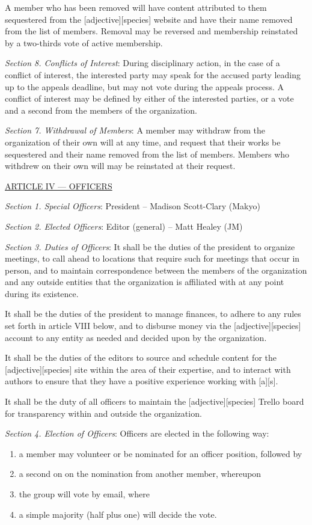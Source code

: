 \documentclass{article}
\begin{document}
A member who has been removed will have content attributed to them sequestered from the [adjective][species] website and have their name removed from the list of members.  Removal may be reversed and membership reinstated by a two-thirds vote of active membership.

\emph{Section 8. Conflicts of Interest}: During disciplinary action, in the case of a conflict of interest, the interested party may speak for the accused party leading up to the appeals deadline, but may not vote during the appeals process.  A conflict of interest may be defined by either of the interested parties, or a vote and a second from the members of the organization.

\emph{Section 7. Withdrawal of Members}: A member may withdraw from the organization of their own will at any time, and request that their works be sequestered and their name removed from the list of members.  Members who withdrew on their own will may be reinstated at their request.

\bigskip

\large{\underline{ARTICLE IV --- OFFICERS}}

\emph{Section 1. Special Officers}: President -- Madison Scott-Clary (Makyo)

\emph{Section 2. Elected Officers}: Editor (general) -- Matt Healey (JM)

\emph{Section 3. Duties of Officers}: It shall be the duties of the president to organize meetings, to call ahead to locations that require such for meetings that occur in person, and to maintain correspondence between the members of the organization and any outside entities that the organization is affiliated with at any point during its existence.

It shall be the duties of the president to manage finances, to adhere to any rules set forth in article VIII below, and to disburse money via the [adjective][species] account to any entity as needed and decided upon by the organization.

It shall be the duties of the editors to source and schedule content for the [adjective][species] site within the area of their expertise, and to interact with authors to ensure that they have a positive experience working with [a][s].

It shall be the duty of all officers to maintain the [adjective][species] Trello board for transparency within and outside the organization.

\emph{Section 4. Election of Officers}: Officers are elected in the following way:
\begin{enumerate}
  \item a member may volunteer or be nominated for an officer position, followed by
  \item a second on on the nomination from another member, whereupon
  \item the group will vote by email, where
  \item a simple majority (half plus one) will decide the vote.
\end{enumerate}
\end{document}
